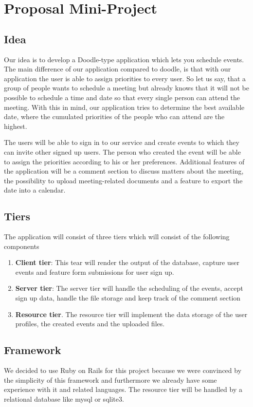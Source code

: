 \documentclass[a4paper, 10pt]{article}
\begin{document}
	\section{Proposal Mini-Project}
	
	\subsection{Idea}
	
	\par{Our idea is to develop a Doodle-type application which lets you schedule events. The main difference of our application compared to doodle, is that with our application the user is able to assign priorities to every user. So let us say, that a group of people wants to schedule a meeting but already knows that it will not be possible to schedule a time and date so that every single person can attend the meeting. With this in mind, our application tries to determine the best available date, where the cumulated priorities of the people who can attend are the highest.}
	\par{The users will be able to sign in to our service and create events to which they can invite other signed up users. The person who created the event will be able to assign the priorities according to his or her preferences. Additional features of the application will be a comment section to discuss matters about the meeting, the possibility to upload meeting-related documents and a feature to export the date into a calendar.}
	
	\subsection{Tiers}
	\par{The application will consist of three tiers which will consist of the following components}
	
	\begin{enumerate}
		\item \textbf{Client tier}: This tear will render the output of the database, capture user events and feature form submissions for user sign up.
		\item \textbf{Server tier}: The server tier will handle the scheduling of the events, accept sign up data, handle the file storage and keep track of the comment section
		\item \textbf{Resource tier}. The resource tier will implement the data storage of the user profiles, the created events and the uploaded files.
	\end{enumerate}
	
	\subsection{Framework}
	\par{We decided to use Ruby on Rails for this project because we were convinced by the simplicity of this framework and furthermore we already have some experience with it and related languages. The resource tier will be handled by a relational database like mysql or sqlite3.}
	
\end{document}

